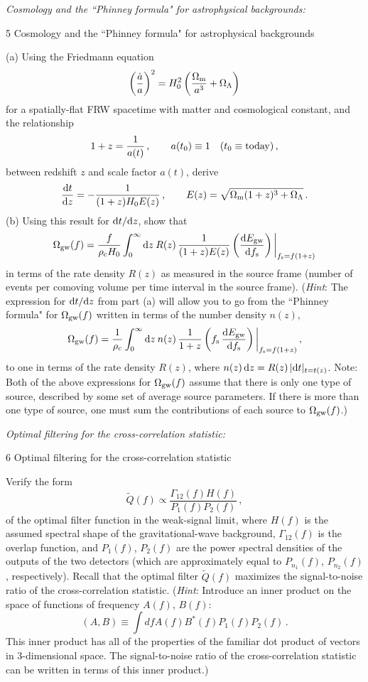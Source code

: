 \documentclass[11pt]{article}
\def\be{\begin{equation}}
\def\ee{\end{equation}}
\def\i{\item{}}
\def\D{{\rm d}}
\begin{document}
\i {\em Cosmology and the ``Phinney formula" for astrophysical backgrounds:}
{5 Cosmology and the ``Phinney formula" for astrophysical backgrounds}

(a) Using the Friedmann equation
%
\be
\left(\frac{\dot a}{a}\right)^2
=H_0^2\left(\frac{\Omega_{\rm m}}{a^{3}} + \Omega_\Lambda\right)
\ee
%
for a spatially-flat FRW spacetime with matter and 
cosmological constant, and the relationship 
%
\be
1+z = \frac{1}{a(t)}\,,
\qquad a(t_0)\equiv 1\quad(t_0\equiv {\rm today})\,,
\ee
%
between redshift $z$ and scale factor $a(t)$,
derive 
%
\be
\frac{\D t}{\D z} =-\frac{1}{(1+z)H_0 E(z)}\,,
\qquad
E(z) = \sqrt{\Omega_{\rm m}(1+z)^3 + \Omega_\Lambda}\,.
\ee
%
(b) Using this result for $\D t/\D z$, show that 
%
\be
\Omega_{\rm gw}(f)= \frac{f}{\rho_{\rm c}H_0}
\int_0^\infty \D z\>R(z)\,\frac{1}{(1+z)E(z)}
\left(\frac{\D E_{\rm gw}}{\D f_{\rm s}}\right)\bigg|_{f_{\rm s}=f(1+z)}
\ee
%
in terms of the rate density $R(z)$ as measured in 
the source frame 
(number of events per comoving volume per time interval
in the source frame).
({\em Hint}: The expression for $\D t/\D z$ from part
(a) will allow 
you to go from the ``Phinney formula" for
$\Omega_{\rm gw}(f)$ written in terms of the number 
density $n(z)$,
%
\be
\Omega_{\rm gw}(f)= \frac{1}{\rho_c}\int_0^\infty \D z\>
n(z)\,\frac{1}{1+z}\left(f_{\rm s}\,
\frac{\D E_{\rm gw}}{\D f_{\rm s}}\right)\bigg|_{f_{\rm s}=f(1+z)}\,,
\ee
%
to one in terms of the rate density 
$R(z)$, where $n(z)\,\D z=R(z)\,|\D t|_{t=t(z)}$.
Note: Both of the above expressions for $\Omega_{\rm gw}(f)$
assume that there is only one type of source, described by 
some set of average source parameters.  
If there is more than one type of source, one must sum
the contributions of each source to $\Omega_{\rm gw}(f)$.)

\i {\em Optimal filtering for the cross-correlation statistic:}
{6 Optimal filtering for the cross-correlation statistic}

Verify the form 
%
\be
\tilde Q(f)\propto \frac{\Gamma_{12}(f)H(f)}
{P_1(f)P_2(f)}\,,
\ee
of the optimal filter function in the weak-signal limit,
where $H(f)$ is the assumed spectral shape of the 
gravitational-wave background,
$\Gamma_{12}(f)$ is the overlap function, and $P_1(f)$, $P_2(f)$ 
are the power spectral densities of the outputs of the 
two detectors (which are approximately equal to 
$P_{n_1}(f)$, $P_{n_2}(f)$, respectively).
Recall that the optimal filter $\tilde Q(f)$ maximizes
the signal-to-noise ratio of the cross-correlation 
statistic.
({\em Hint}: Introduce an inner product on the space of
functions of frequency $A(f)$, $B(f)$:
%
\be
(A,B)\equiv\int df A(f) B^*(f) P_1(f) P_2(f)\,.
\ee
%
This inner product
has all of the properties of the familiar dot product
of vectors in 3-dimensional space.
The signal-to-noise ratio of the cross-correlation
statistic can be written in terms of this inner product.)
\end{document}
